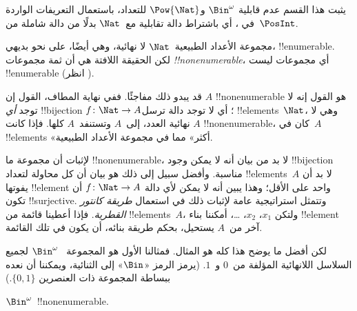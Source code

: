 \documentclass[../../../include/open-logic-section]{subfiles}
\begin{document}


\begin{editorial}
  يثبت هذا القسم عدم قابلية $\Bin^\omega$ و$\Pow{\Nat}$ للتعداد،
  باستعمال التعريفات الواردة في ، أي باشتراط
  دالة تقابلية مع~$\Nat$ بدلًا من دالة شاملة من~$\PosInt$.
\end{editorial}

\begin{explain}
مجموعة الأعداد الطبيعية~$\Nat$ لا نهائية، وهي أيضًا، على نحو بديهي،
!!{enumerable}. لكن الحقيقة اللافتة هي أن ثمة مجموعات
\emph{!!{nonenumerable}}، أي مجموعات ليست !!{enumerable}
(انظر ).

قد يبدو ذلك مفاجئًا. ففي نهاية المطاف، القول إن $A$
!!{nonenumerable} هو القول إنه لا توجد \emph{أي} !!{bijection} $f
\colon \Nat \to A$؛ أي لا توجد دالة ترسل !!{element}s~$\Nat$،
وهي لا نهائية العدد، إلى~$A$ وتستنفد~$A$ كلها. فإذا كانت $A$
!!{nonenumerable}، كان في~$A$ !!{element}s «أكثر» مما في مجموعة
الأعداد الطبيعية.

لإثبات أن مجموعة ما !!{nonenumerable}، لا بد من بيان أنه لا يمكن
وجود !!{bijection} مناسبة. وأفضل سبيل إلى ذلك هو بيان أن كل محاولة
لتعداد !!{element}s~$A$ لا بد أن يفوتها !!{element} واحد على الأقل؛
وهذا يبين أنه لا يمكن لأي دالة $f\colon \Nat \to A$ أن تكون
!!{surjective}. وتتمثل استراتيجية عامة لإثبات ذلك في استعمال
\emph{طريقة كانتور القطرية}. فإذا أعطينا قائمة من !!{element}s~$A$،
ولتكن $x_1$، $x_2$، \dots، أمكننا بناء !!{element} آخر من~$A$ يستحيل،
بحكم طريقة بنائه، أن يكون في تلك القائمة.

لكن أفضل ما يوضح هذا كله هو المثال. فمثالنا الأول هو المجموعة
~$\Bin^\omega$ لجميع السلاسل اللانهائية المؤلفة من~$0$ و~$1$.
(يرمز الرمز «$\Bin$» إلى الثنائية، ويمكننا أن نعده ببساطة المجموعة
ذات العنصرين
$\{0,1\}$.)
\end{explain}

\begin{thm}
$\Bin^\omega$~!!{nonenumerable}.
\end{thm}
\end{document}
